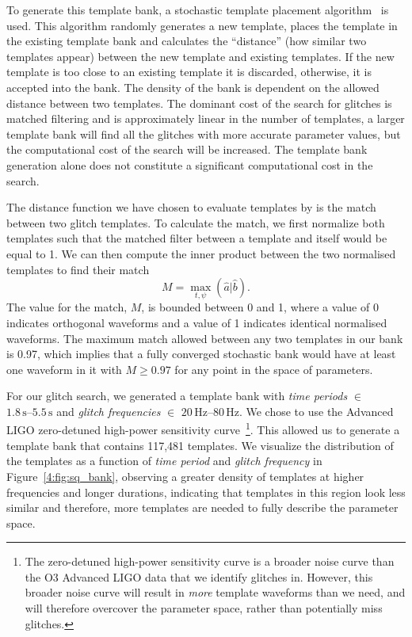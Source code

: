 To generate this template bank, a stochastic template placement algorithm~\cite{Harry_sbank:2009} is used. This algorithm randomly generates a new template, places the template in the existing template bank and calculates the ``distance'' (how similar two templates appear) between the new template and existing templates. If the new template is too close to an existing template it is discarded, otherwise, it is accepted into the bank. The density of the bank is dependent on the allowed distance between two templates. The dominant cost of the search for \scladj glitches is matched filtering and is approximately linear in the number of templates, a larger template bank will find all the glitches with more accurate parameter values, but the computational cost of the search will be increased. The template bank generation alone does not constitute a significant computational cost in the search.

The distance function we have chosen to evaluate templates by is the match between two glitch templates. To calculate the match, we first normalize both templates such that the matched filter between a template and itself would be equal to 1. We can then compute the inner product between the two normalised templates to find their match
%
\begin{equation}
    M = \max_{t, \psi} (\hat{a} | \hat{b}).
  \label{4:eqn:match}
\end{equation}
%
The value for the match, $M$,  is bounded between 0 and 1, where a value of 0 indicates orthogonal waveforms and a value of 1 indicates identical normalised waveforms. The maximum match allowed between any two templates in our bank is 0.97, which implies that a fully converged stochastic bank would have at least one waveform in it with $M \geq 0.97$ for any point in the space of parameters. 

For our \scladj glitch search, we generated a template bank with \emph{time periods} $\in$ $1.8 \, \text{s}\text{--}5.5 \, \text{s}$ and \emph{glitch frequencies} $\in$ $20 \, \text{Hz}\text{--} 80 \, \text{Hz}$. We chose to use the Advanced LIGO zero-detuned high-power sensitivity curve~\cite{aLIGO_design_curve:2018}\footnote{The zero-detuned high-power sensitivity curve is a broader noise curve than the O3 Advanced LIGO data that we identify \scladj glitches in. However, this broader noise curve will result in \textit{more} template waveforms than we need, and will therefore overcover the parameter space, rather than potentially miss \scladj glitches.}. This allowed us to generate a template bank that contains 117,481 templates. We visualize the distribution of the templates as a function of \emph{time period} and \emph{glitch frequency} in Figure~\ref{4:fig:sq_bank}, observing a greater density of templates at higher frequencies and longer durations, indicating that templates in this region look less similar and therefore, more templates are needed to fully describe the parameter space.

